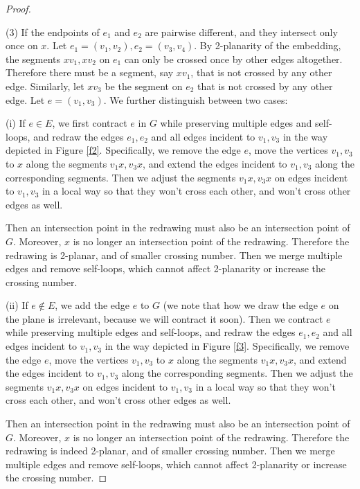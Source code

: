 \documentclass[10pt,fleqn]{article}
\begin{document}
\begin{proof}
\begin{figure}[h]
			\label{f1}
		\end{figure} \par
		(3) If the endpoints of $e_1$ and $e_2$ are pairwise different, and they intersect only once on $x$. Let $e_1=(v_1,v_2),e_2=(v_3,v_4)$. By 2-planarity of the embedding, the segments $xv_1,xv_2$ on $e_1$ can only be crossed once by other edges altogether. Therefore there must be a segment, say $xv_1$, that is not crossed by any other edge. Similarly, let $xv_3$ be the segment on $e_2$ that is not crossed by any other edge. Let $e=(v_1,v_3)$. We further distinguish between two cases: \par
		(i) If $e\in E$, we first contract $e$ in $G$ while preserving multiple edges and self-loops, and redraw the edges $e_1,e_2$ and all edges incident to $v_1,v_3$ in the way depicted in Figure \ref{f2}. Specifically, we remove the edge $e$, move the vertices $v_1,v_3$ to $x$ along the segments $v_1x,v_3x$, and extend the edges incident to $v_1,v_3$ along the corresponding segments. Then we adjust the segments $v_1x,v_3x$ on edges incident to $v_1,v_3$ in a local way so that they won't cross each other, and won't cross other edges as well.\par
		Then an intersection point in the redrawing must also be an intersection point of $G$. Moreover, $x$ is no longer an intersection point of the redrawing. Therefore the redrawing is 2-planar, and of smaller crossing number. Then we merge multiple edges and remove self-loops, which cannot affect 2-planarity or increase the crossing number.\par
		(ii) If $e\notin E$, we add the edge $e$ to $G$ (we note that how we draw the edge $e$ on the plane is irrelevant, because we will contract it soon). Then we contract $e$ while preserving multiple edges and self-loops, and redraw the edges $e_1,e_2$ and all edges incident to $v_1,v_3$ in the way depicted in Figure \ref{f3}. Specifically, we remove the edge $e$, move the vertices $v_1,v_3$ to $x$ along the segments $v_1x,v_3x$, and extend the edges incident to $v_1,v_3$ along the corresponding segments. Then we adjust the segments $v_1x,v_3x$ on edges incident to $v_1,v_3$ in a local way so that they won't cross each other, and won't cross other edges as well.\par
		Then an intersection point in the redrawing must also be an intersection point of $G$. Moreover, $x$ is no longer an intersection point of the redrawing. Therefore the redrawing is indeed 2-planar, and of smaller crossing number. Then we merge multiple edges and remove self-loops, which cannot affect 2-planarity or increase the crossing number.\par

\end{proof}
\end{document}
